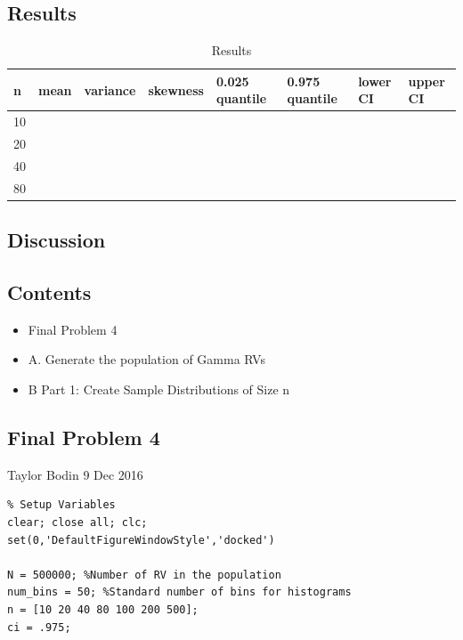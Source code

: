 \documentclass[12pt]{article}
\begin{document}
\subsection{Results}
\begin{table}[h]
\centering
\caption{Results}
\label{p4_data}
\begin{tabular}{|l|l|l|l|l|l|l|l|}
  \hline 
n  & mean & variance & skewness & 0.025 quantile & 0.975 quantile & lower CI & upper CI \\
\hline
10 &      &          &          &                &                &          &          \\
\hline
20 &      &          &          &                &                &          &          \\
\hline
40 &      &          &          &                &                &          &          \\
\hline
80 &      &          &          &                &                &          &         \\
\hline
\end{tabular}
\end{table}
\subsection{Discussion}
\subsection*{Contents}

\begin{itemize}
\setlength{\itemsep}{-1ex}
   \item Final Problem 4
   \item A. Generate the population of Gamma RVs
   \item B Part 1: Create Sample Distributions of Size n
\end{itemize}


\subsection*{Final Problem 4}

\begin{par}
Taylor Bodin 9 Dec 2016
\end{par} \vspace{1em}
\begin{verbatim}
% Setup Variables
clear; close all; clc;
set(0,'DefaultFigureWindowStyle','docked')

N = 500000; %Number of RV in the population
num_bins = 50; %Standard number of bins for histograms
n = [10 20 40 80 100 200 500];
ci = .975;
\end{verbatim}
\end{document}
